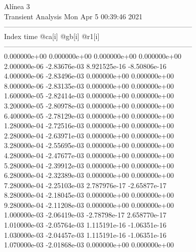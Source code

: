                                    Alínea 3 \\ \hline
                                   Transient Analysis  Mon Apr  5 00:39:46  2021\\ \hline
--------------------------------------------------------------------------------\\ \hline
Index   time            @ca[i]          @gb[i]          @r1[i]          \\ \hline
--------------------------------------------------------------------------------\\ 	0.000000e+00	0.000000e+00	0.000000e+00	0.000000e+00	\\ 	2.000000e-06	-2.83676e-03	8.921525e-16	-8.50806e-16	\\ 	4.000000e-06	-2.83496e-03	0.000000e+00	0.000000e+00	\\ 	8.000000e-06	-2.83135e-03	0.000000e+00	0.000000e+00	\\ 	1.600000e-05	-2.82414e-03	0.000000e+00	0.000000e+00	\\ 	3.200000e-05	-2.80978e-03	0.000000e+00	0.000000e+00	\\ 	6.400000e-05	-2.78129e-03	0.000000e+00	0.000000e+00	\\ 	1.280000e-04	-2.72516e-03	0.000000e+00	0.000000e+00	\\ 	2.280000e-04	-2.63971e-03	0.000000e+00	0.000000e+00	\\ 	3.280000e-04	-2.55695e-03	0.000000e+00	0.000000e+00	\\ 	4.280000e-04	-2.47677e-03	0.000000e+00	0.000000e+00	\\ 	5.280000e-04	-2.39912e-03	0.000000e+00	0.000000e+00	\\ 	6.280000e-04	-2.32389e-03	0.000000e+00	0.000000e+00	\\ 	7.280000e-04	-2.25103e-03	2.787976e-17	-2.65877e-17	\\ 	8.280000e-04	-2.18045e-03	0.000000e+00	0.000000e+00	\\ 	9.280000e-04	-2.11208e-03	0.000000e+00	0.000000e+00	\\ 	1.000000e-03	-2.06419e-03	-2.78798e-17	2.658770e-17	\\ 	1.010000e-03	-2.05764e-03	1.115191e-16	-1.06351e-16	\\ 	1.030000e-03	-2.04457e-03	1.115191e-16	-1.06351e-16	\\ 	1.070000e-03	-2.01868e-03	0.000000e+00	0.000000e+00	\\ \hline
